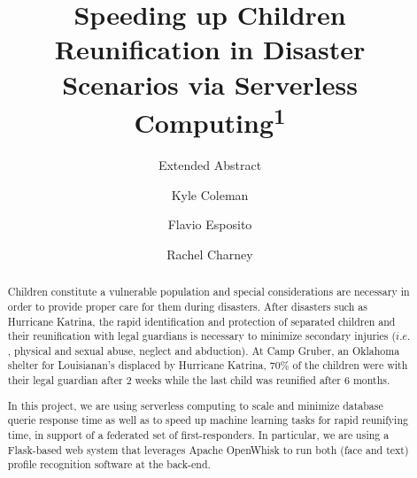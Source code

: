 \documentclass[sigconf]{acmart}
\begin{document}
\begin{titlepage}
\title{%
Speeding up  Children Reunification in Disaster \\ Scenarios via Serverless Computing\textsuperscript{1}} 
\subtitle{Extended Abstract}




\author{Kyle Coleman}




\author{Flavio Esposito}

\author{Rachel Charney}



\begin{abstract}
Children constitute a vulnerable population and special considerations are necessary in order to provide proper care for them during disasters. After disasters such as Hurricane Katrina, the rapid identification and protection of separated children and their reunification with legal guardians is necessary to minimize secondary injuries ($i.e.$, physical and sexual abuse, neglect and abduction). At Camp Gruber, an Oklahoma shelter for Louisianan's displaced by Hurricane Katrina, $70\%$ of the children were with their legal guardian after 2 weeks while the last child was reunified after 6 months. 

In this project, we are using serverless computing to scale and minimize database querie response time as well as to speed up machine learning tasks for rapid reunifying time, in support of a federated set of first-responders. In particular, we are using a Flask-based web system that leverages Apache OpenWhisk to run both (face and text) profile recognition software at the back-end.
\end{abstract}




\end{titlepage}
\end{document}
